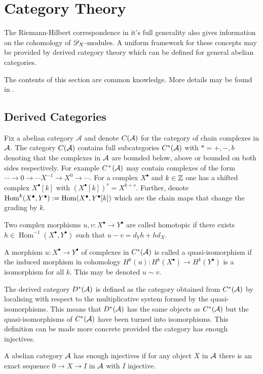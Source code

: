 \section{Category Theory}
The Riemann-Hilbert correspondence in it's full generality also gives information on the cohomology of $\D_X$-modules.
A uniform framework for these concepts may be provided by derived category theory which can be defined for general abelian categories.

The contents of this section are common knowledge.
More details may be found in \cite[Chapters 1 and 5]{dimca2004sheaves}.

\subsection{Derived Categories}
Fix a abelian category $\mathcal{A}$ and denote $C(\AA)$ for the category of chain complexes in $\AA$.
The category $C(\AA)$ contains full subcategories $C^*(\AA)$ with $*= +, -, b$ denoting that the complexes in $\AA$ are bounded below, above or bounded on both sides respectively.
For example $C^+(\AA)$ may contain complexes of the form $\cdots \to 0\to \cdots X^{-1} \to X^0 \to \cdots$.
For a complex $X^\bullet$ and $k\in \Z$ one has a shifted complex $X^\bullet[k]$ with $(X^\bullet[k])^s = X^{k+s}$.
Further, denote $\operatorname{Hom}^k(X^\bullet, Y^\bullet) :=  \op{Hom}(X^\bullet, Y^\bullet[k])$ which are the chain maps that change the grading by $k$.
\begin{definition}
  Two complex morphisms $u,v:X^\bullet\to Y^\bullet$ are called homotopic if there exists $h\in \operatorname{Hom}^{-1}(X^\bullet, Y^\bullet)$ such that $u-v = d_Y h + hd_X$.
\end{definition}
\begin{definition}
  A morphism $u:X^\bullet\to Y^\bullet$  of complexes in $C^*(\AA)$ is called a quasi-isomorphism if the induced morphism in cohomology $H^k(u):H^k(X^\bullet) \to H^k(Y^\bullet)$ is a isomorphism for all $k$. This may be denoted $u\sim v$.
\end{definition}
The derived category $D^*(\AA)$ is defined as the category obtained from $C^*(\AA)$ by localising with respect to the multiplicative system formed by the quasi-isomorphisms.
This means that $D^*(\AA)$ has the same objects as $C^*(\AA)$ but the quasi-isomorphisms of $C^*(\AA)$ have been turned into isomorphisms.
This definition can be made more concrete provided the category has enough injectives.
\begin{definition}
  A abelian category $\AA$ has enough injectives if for any object $X$ in $\AA$ there is an exact sequence $0\to X \to I$ in $\AA$ with $I$ injective.
\end{definition}
